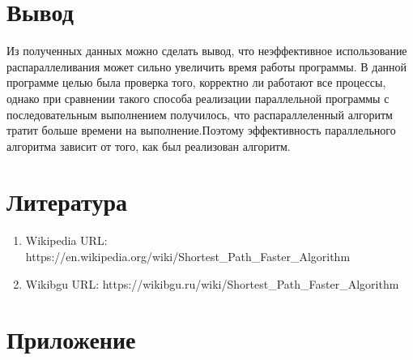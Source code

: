 \documentclass{report}
\begin{document}
\section*{Вывод}
Из полученных данных можно сделать вывод, что неэффективное использование распараллеливания может сильно увеличить время работы программы. В данной программе целью была проверка того, корректно ли работают все процессы, однако при сравнении такого способа реализации параллельной программы с последовательным выполнением получилось, что распараллеленный алгоритм тратит больше времени на выполнение.Поэтому эффективность параллельного алгоритма зависит от того, как был реализован алгоритм.
\newpage

\section*{Литература}
\begin{enumerate}
\item Wikipedia \newline URL: https://en.wikipedia.org/wiki/Shortest\_Path\_Faster\_Algorithm
\item Wikibgu \newline URL: https://wikibgu.ru/wiki/Shortest\_Path\_Faster\_Algorithm
\end{enumerate} 
\newpage

\section*{Приложение}
\end{document}
